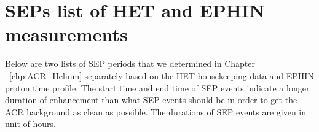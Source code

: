 \chapter{SEPs list of HET and EPHIN measurements}

Below are two lists of \ac{SEP} periods that we determined in Chapter ~\ref{chp:ACR_Helium} separately based on the \ac{HET} housekeeping data and \ac{EPHIN} proton time profile. The start time and end time of \ac{SEP} events indicate a longer duration of enhancement than what \ac{SEP} events should be in order to get the \ac{ACR} background as clean as possible. The durations of \ac{SEP} events are given in unit of hours.
\label{Appendix:SEPlist}

\begin{center}
    \begin{longtable}{|c|c|c|c|}
   

\end{longtable}
\end{center}
